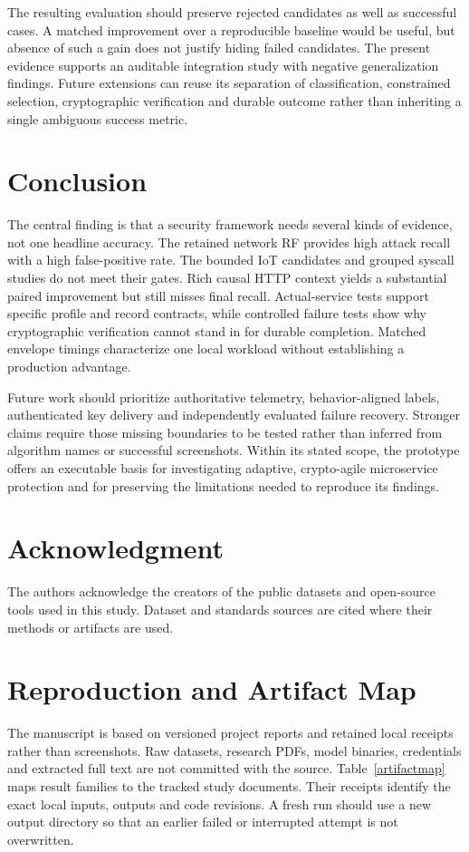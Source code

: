 \documentclass[conference,a4paper]{IEEEtran}
\begin{document}
The resulting evaluation should preserve rejected candidates as well as successful cases. A matched improvement over a reproducible baseline would be useful, but absence of such a gain does not justify hiding failed candidates. The present evidence supports an auditable integration study with negative generalization findings. Future extensions can reuse its separation of classification, constrained selection, cryptographic verification and durable outcome rather than inheriting a single ambiguous success metric.

\section{Conclusion}
The central finding is that a security framework needs several kinds of evidence, not one headline accuracy. The retained network RF provides high attack recall with a high false-positive rate. The bounded IoT candidates and grouped syscall studies do not meet their gates. Rich causal HTTP context yields a substantial paired improvement but still misses final recall. Actual-service tests support specific profile and record contracts, while controlled failure tests show why cryptographic verification cannot stand in for durable completion. Matched envelope timings characterize one local workload without establishing a production advantage.

Future work should prioritize authoritative telemetry, behavior-aligned labels, authenticated key delivery and independently evaluated failure recovery. Stronger claims require those missing boundaries to be tested rather than inferred from algorithm names or successful screenshots. Within its stated scope, the prototype offers an executable basis for investigating adaptive, crypto-agile microservice protection and for preserving the limitations needed to reproduce its findings.

\section*{Acknowledgment}
The authors acknowledge the creators of the public datasets and open-source tools used in this study. Dataset and standards sources are cited where their methods or artifacts are used.

\appendices
\section{Reproduction and Artifact Map}
The manuscript is based on versioned project reports and retained local receipts rather than screenshots. Raw datasets, research PDFs, model binaries, credentials and extracted full text are not committed with the source. Table~\ref{artifactmap} maps result families to the tracked study documents. Their receipts identify the exact local inputs, outputs and code revisions. A fresh run should use a new output directory so that an earlier failed or interrupted attempt is not overwritten.
\end{document}
